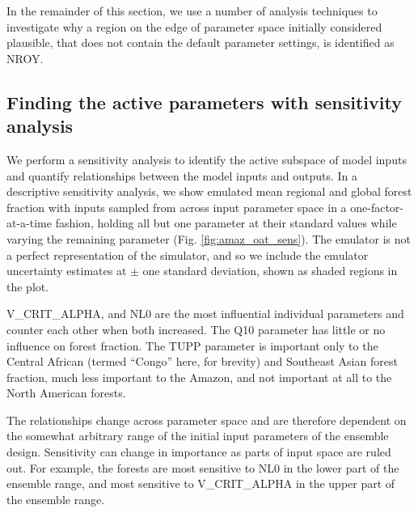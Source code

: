 \documentclass[esd, article]{copernicus} %
\begin{document}

In the remainder of this section, we use a number of analysis techniques to investigate why a region on the edge of parameter space initially considered plausible, that does not contain the default parameter settings, is identified as NROY.

\subsection{Finding the active parameters with sensitivity analysis}\label{ssec:sensitivity}

We perform a sensitivity analysis to identify the active subspace of model inputs and quantify relationships between the model inputs and outputs. In a descriptive sensitivity analysis, we show emulated mean regional and global forest fraction with inputs sampled from across input parameter space in a one-factor-at-a-time fashion, holding all but one parameter at their standard values while varying the remaining parameter (Fig.  \ref{fig:amaz_oat_sens}). The emulator is not a perfect representation of the simulator, and so we include the emulator uncertainty estimates at $\pm$ one standard deviation, shown as shaded regions in the plot.

V\_CRIT\_ALPHA, and NL0 are the most influential individual parameters and counter each other when both increased. The Q10 parameter has little or no influence on forest fraction. The TUPP parameter is important only to the Central African (termed ``Congo'' here, for brevity) and Southeast Asian forest fraction, much less important to the Amazon, and not important at all to the North American forests. 

The relationships change across parameter space and are therefore dependent on the somewhat arbitrary range of the initial input parameters of the ensemble design. Sensitivity can change in importance as parts of input space are ruled out. For example, the forests are most sensitive to NL0 in the lower part of the ensemble range, and most sensitive to V\_CRIT\_ALPHA in the upper part of the ensemble range.

\end{document}

